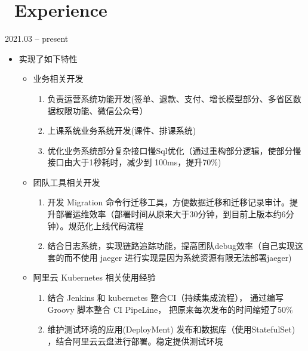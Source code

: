 \documentclass{resume}
\begin{document}



\section{\faUsers\ Experience}
 {2021.03 -- present}
\role{Backend Engineer}
\newline
{}

\begin{itemize}
  \item 实现了如下特性
        \begin{itemize}
          \item 业务相关开发
                \begin{enumerate}
                  \item 负责运营系统功能开发(签单、退款、支付、增长模型部分、多省区数据权限功能、微信公众号）
                  \item 上课系统业务系统开发(课件、排课系统)
                  \item 优化业务系统部分复杂接口慢Sql优化（通过重构部分逻辑，使部分慢接口由大于1秒耗时，减少到 100ms，提升70\%)
                \end{enumerate}
        \end{itemize}
        \begin{itemize}
          \item 团队工具相关开发
                \begin{enumerate}
                  \item 开发 Migration 命令行迁移工具，方便数据迁移和迁移记录审计。提升部署运维效率（部署时间从原来大于30分钟，到目前上版本约6分钟）。规范化上线代码流程
                  \item 结合日志系统，实现链路追踪功能，提高团队debug效率（自己实现这套的而不使用 jaeger 进行实现是因为系统资源有限无法部署jaeger)
                \end{enumerate}
        \end{itemize}
        \begin{itemize}
          \item 阿里云 Kubernetes 相关使用经验
                \begin{enumerate}
                  \item 结合 Jenkins 和 kubernetes 整合CI（持续集成流程）， 通过编写 Groovy 脚本整合 CI PipeLine， 把原来每次发布的时间缩短了50\%
                  \item 维护测试环境的应用(DeployMent) 发布和数据库（使用StatefulSet) ，结合阿里云云盘进行部署。稳定提供测试环境
                \end{enumerate}
        \end{itemize}
\end{itemize}
\end{document}
